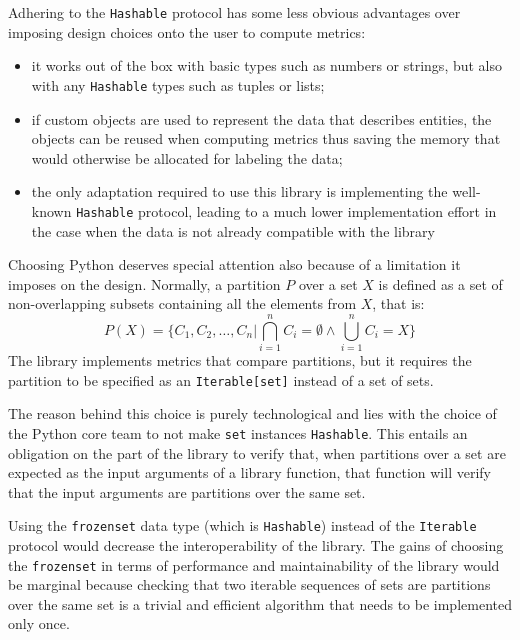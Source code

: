 \documentclass{article}
\begin{document}
    Adhering to the \texttt{Hashable} protocol has some less obvious advantages
    over imposing design choices onto the user to compute metrics:
    \begin{itemize}
        \item it works out of the box with basic types such as numbers or
        strings, but also with any \texttt{Hashable} types such as tuples or
        lists;
        \item if custom objects are used to represent the data that describes
        entities, the objects can be reused when computing metrics thus saving
        the memory that would otherwise be allocated for labeling the data;
        \item the only adaptation required to use this library is implementing
        the well-known \texttt{Hashable} protocol, leading to a much lower
        implementation effort in the case when the data is not already
        compatible with the library\@
    \end{itemize}

    Choosing Python deserves special attention also because of a limitation it
    imposes on the design.
    Normally, a partition $P$ over a set $X$ is defined as a set of
    non-overlapping subsets containing all the elements from $X$, that is:
    \begin{equation}
        P(X) = \{ C_1, C_2, \ldots, C_n | \bigcap\limits^n_{i=1}C_i=\emptyset \land \bigcup\limits^n_{i=1}C_i=X \}
    \end{equation}
    The library implements metrics that compare partitions, but it requires the
    partition to be specified as an \texttt{Iterable[set]} instead of a set of
    sets.

    The reason behind this choice is purely technological and lies with the
    choice of the Python core team to not make \texttt{set} instances
    \texttt{Hashable}.
    This entails an obligation on the part of the library to verify that, when
    partitions over a set are expected as the input arguments of a library
    function, that function will verify that the input arguments are partitions
    over the same set.

    Using the \texttt{frozenset} data type (which is \texttt{Hashable}) instead
    of the \texttt{Iterable} protocol would decrease the interoperability of the
    library.
    The gains of choosing the \texttt{frozenset} in terms of performance and
    maintainability of the library would be marginal because checking that two
    iterable sequences of sets are partitions over the same set is a trivial and
    efficient algorithm that needs to be implemented only once.
\end{document}
